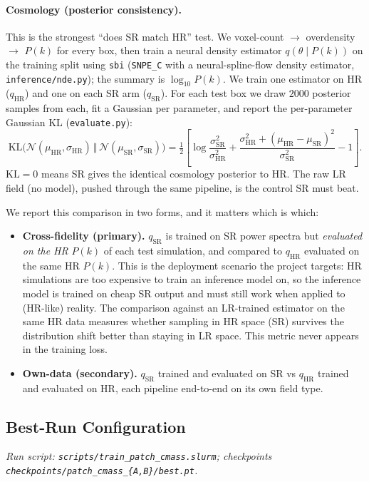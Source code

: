 \paragraph{Cosmology (posterior consistency).} This is the strongest ``does SR
match HR'' test. We voxel-count $\to$ overdensity $\to$ $P(k)$ for every box, then
train a neural density estimator $q(\theta\mid P(k))$ on the training split using
\texttt{sbi} (\texttt{SNPE\_C} with a neural-spline-flow density estimator,
\texttt{inference/nde.py}); the summary is $\log_{10}P(k)$. We train one estimator
on HR ($q_\text{HR}$) and one on each SR arm ($q_\text{SR}$). For each test box we
draw $2000$ posterior samples from each, fit a Gaussian per parameter, and report
the per-parameter Gaussian KL (\texttt{evaluate.py}):
\begin{equation}
  \mathrm{KL}\big(\mathcal N(\mu_\text{HR},\sigma_\text{HR})\,\Vert\,\mathcal N(\mu_\text{SR},\sigma_\text{SR})\big)
  = \tfrac12\!\left[\log\frac{\sigma_\text{SR}^2}{\sigma_\text{HR}^2}
    + \frac{\sigma_\text{HR}^2+(\mu_\text{HR}-\mu_\text{SR})^2}{\sigma_\text{SR}^2} - 1\right].
  \label{eq:srs-kl}
\end{equation}
$\mathrm{KL}=0$ means SR gives the identical cosmology posterior to HR. The raw LR
field (no model), pushed through the same pipeline, is the control SR must beat.

We report this comparison in two forms, and it matters which is which:
\begin{itemize}
  \item \textbf{Cross-fidelity (primary).} $q_\text{SR}$ is trained on SR power
  spectra but \emph{evaluated on the HR} $P(k)$ of each test simulation, and
  compared to $q_\text{HR}$ evaluated on the same HR $P(k)$. This is the
  deployment scenario the project targets: HR simulations are too expensive to
  train an inference model on, so the inference model is trained on cheap SR
  output and must still work when applied to (HR-like) reality. The comparison
  against an LR-trained estimator on the same HR data measures whether sampling
  in HR space (SR) survives the distribution shift better than staying in LR
  space. This metric never appears in the training loss.
  \item \textbf{Own-data (secondary).} $q_\text{SR}$ trained and evaluated on SR
  vs $q_\text{HR}$ trained and evaluated on HR, each pipeline end-to-end on
  its own field type.
\end{itemize}

\subsection{Best-Run Configuration}
\textit{Run script: \texttt{scripts/train\_patch\_cmass.slurm}; checkpoints
\texttt{checkpoints/patch\_cmass\_\{A,B\}/best.pt}.}

